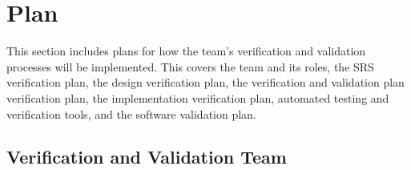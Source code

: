 \documentclass[12pt, titlepage]{article}
\begin{document}
\citet{SRS}


\newpage

\section{Plan}
\hspace{2em}This section includes plans for how the team's verification and validation processes will
be implemented. This covers the team and its roles, the SRS verification plan, the design
verification plan, the verification and validation plan verification plan, the implementation
verification plan, automated testing and verification tools, and the software validation plan.

\subsection{Verification and Validation Team}
\end{document}

